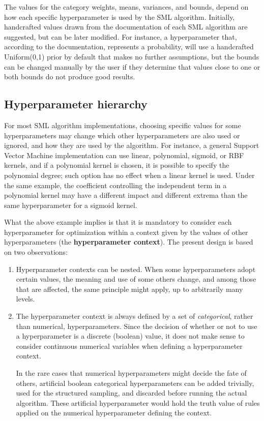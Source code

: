 	The values for the category weights, means, variances, and bounds, depend on how each specific
	hyperparameter is used by the SML algorithm. Initially, handcrafted values drawn from the
	documentation of each SML algorithm are suggested, but can be later modified. For instance, a
	hyperparameter that, according to the documentation, represents a probability, will use a
	handcrafted Uniform(0,1) prior by default that makes no further assumptions, but the bounds can
	be changed manually by the user if they determine that values close to one or both bounds do not produce
	good results.

	\subsection{Hyperparameter hierarchy}
	\label{ssec:hyp_hierarchy}
	For most SML algorithm implementations, choosing specific values for some hyperparameters may
	change which other hyperparameters are also used or ignored, and how they are used by the
	algorithm. For instance, a general Support Vector Machine implementation can use linear,
	polynomial, sigmoid, or RBF kernels, and if a polynomial kernel is chosen, it is possible to
	specify the polynomial degree; such option has no effect when a linear kernel is used. Under the
	same example, the coefficient controlling the independent term in a polynomial kernel may have
	a different impact and different extrema than the same hyperparameter for a sigmoid kernel.

	What the above example implies is that it is mandatory to consider each hyperparameter for
	optimization within a context given by the values of other hyperparameters (the {\bf
	hyperparameter context}). The present design
	is based on two observations:
	\begin{enumerate}
		\item
		Hyperparameter contexts can be nested. When some hyperparameters adopt certain values, the
		meaning and use of some others change, and among those that are affected, the same principle
		might apply, up to arbitrarily many levels.
		\item
		The hyperparameter context is always defined by a set of \emph{categorical}, rather than
		numerical, hyperparameters. Since the decision of whether or not to use a hyperparameter is
		a discrete (boolean) value, it does not make sense to consider continuous numerical
		variables when defining a hyperparameter context.
		
		In the rare cases that numerical hyperparameters might decide
		the fate of others, artificial boolean categorical hyperparameters can be added trivially,
		used for the structured sampling, and discarded before running the actual algorithm. These
		artificial hyperparameter would hold the truth value of rules applied on the numerical
		hyperparameter defining the context.
	\end{enumerate}

